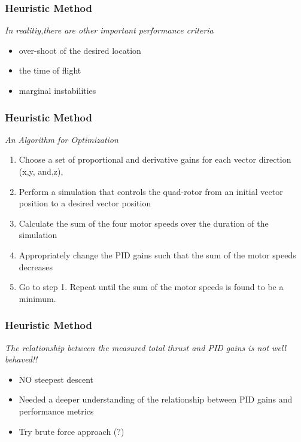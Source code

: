 \documentclass{beamer}
\begin{document}
\begin{frame}

\frametitle{Heuristic Method}

\textit{In realitiy,there are other important performance criteria}
\begin{itemize}
\item over-shoot of the desired location
\item the time of flight
\item marginal instabilities
\end{itemize}
\end{frame}






\begin{frame}
\frametitle{Heuristic Method}

\textit{An Algorithm for Optimization}
\begin{enumerate}
\item Choose a set of proportional and derivative gains for each vector direction (x,y, and,z),
\item Perform a simulation that controls the quad-rotor from an initial vector position to a desired vector position  
\item Calculate the sum of the four motor speeds over the duration of the simulation
\item Appropriately change the PID gains such that the sum of the motor speeds decreases
\item Go to step 1. Repeat until the sum of the motor speeds is found to be a minimum.
\end{enumerate}
\end{frame}



\begin{frame}

\frametitle{Heuristic Method}

\textit{The relationship between the measured total thrust and PID gains is not well behaved!!}

\begin{itemize}
\item NO steepest descent
\item Needed a deeper understanding of the relationship between PID gains and performance metrics
\item Try brute force approach (?)
\end{itemize}
\end{frame}
\end{document}
